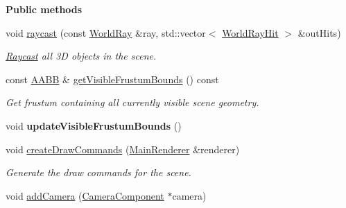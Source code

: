 \begin{Indent}\textbf{ Public methods}\par
\begin{DoxyCompactItemize}
\item 
\mbox{\label{classrev_1_1_scene_a2667cda57a29b95a94356bb7f24892d1}} 
void \mbox{\hyperlink{classrev_1_1_scene_a2667cda57a29b95a94356bb7f24892d1}{raycast}} (const \mbox{\hyperlink{classrev_1_1_world_ray}{World\+Ray}} \&ray, std\+::vector$<$ \mbox{\hyperlink{structrev_1_1_world_ray_hit}{World\+Ray\+Hit}} $>$ \&out\+Hits)
\begin{DoxyCompactList}\small\item\em \mbox{\hyperlink{class_raycast}{Raycast}} all 3D objects in the scene. \end{DoxyCompactList}\item 
\mbox{\label{classrev_1_1_scene_a2a68c0b0841b2e5583f6dc74a4d27284}} 
const \mbox{\hyperlink{classrev_1_1_a_a_b_b}{A\+A\+BB}} \& \mbox{\hyperlink{classrev_1_1_scene_a2a68c0b0841b2e5583f6dc74a4d27284}{get\+Visible\+Frustum\+Bounds}} () const
\begin{DoxyCompactList}\small\item\em Get frustum containing all currently visible scene geometry. \end{DoxyCompactList}\item 
\mbox{\label{classrev_1_1_scene_a4ddc84312f605e1279a7a4d6eb8c2568}} 
void {\bfseries update\+Visible\+Frustum\+Bounds} ()
\item 
\mbox{\label{classrev_1_1_scene_aa63a72cfa74736d38ef7348aa373b54f}} 
void \mbox{\hyperlink{classrev_1_1_scene_aa63a72cfa74736d38ef7348aa373b54f}{create\+Draw\+Commands}} (\mbox{\hyperlink{classrev_1_1_main_renderer}{Main\+Renderer}} \&renderer)
\begin{DoxyCompactList}\small\item\em Generate the draw commands for the scene. \end{DoxyCompactList}\item 
\mbox{\label{classrev_1_1_scene_afdf268e5ce3d6fb47fb990ab360b808c}} 
void \mbox{\hyperlink{classrev_1_1_scene_afdf268e5ce3d6fb47fb990ab360b808c}{add\+Camera}} (\mbox{\hyperlink{classrev_1_1_camera_component}{Camera\+Component}} $\ast$camera)

\end{DoxyCompactItemize}
\end{Indent}

